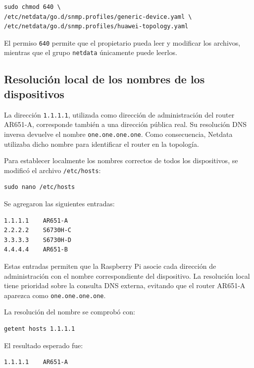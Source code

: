 \begin{lstlisting}[style=terminal]
sudo chmod 640 \
/etc/netdata/go.d/snmp.profiles/generic-device.yaml \
/etc/netdata/go.d/snmp.profiles/huawei-topology.yaml
\end{lstlisting}

El permiso \texttt{640} permite que el propietario pueda leer y modificar los archivos, mientras que el grupo \texttt{netdata} únicamente puede leerlos.

\subsection{Resolución local de los nombres de los dispositivos}

La dirección \texttt{1.1.1.1}, utilizada como dirección de administración del router AR651-A, corresponde también a una dirección pública real. Su resolución DNS inversa devuelve el nombre \texttt{one.one.one.one}. Como consecuencia, Netdata utilizaba dicho nombre para identificar el router en la topología.

Para establecer localmente los nombres correctos de todos los dispositivos, se modificó el archivo \texttt{/etc/hosts}:

\begin{lstlisting}[style=terminal]
sudo nano /etc/hosts
\end{lstlisting}

Se agregaron las siguientes entradas:

\begin{lstlisting}[style=terminal]
1.1.1.1    AR651-A
2.2.2.2    S6730H-C
3.3.3.3    S6730H-D
4.4.4.4    AR651-B
\end{lstlisting}

Estas entradas permiten que la Raspberry Pi asocie cada dirección de administración con el nombre correspondiente del dispositivo. La resolución local tiene prioridad sobre la consulta DNS externa, evitando que el router AR651-A aparezca como \texttt{one.one.one.one}.

La resolución del nombre se comprobó con:

\begin{lstlisting}[style=terminal]
getent hosts 1.1.1.1
\end{lstlisting}

El resultado esperado fue:

\begin{lstlisting}[style=terminal]
1.1.1.1    AR651-A
\end{lstlisting}

